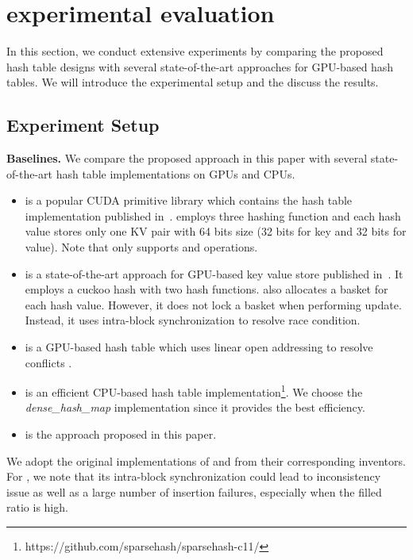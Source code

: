 \section{experimental evaluation}\label{sec:exp}
In this section, we conduct extensive experiments by comparing the proposed hash table designs with several state-of-the-art approaches for GPU-based hash tables. 
We will introduce the experimental setup and the discuss the results. 

\subsection{Experiment Setup}

\vspace{1mm}\noindent\textbf{Baselines.} We compare the proposed approach in this paper with several state-of-the-art hash table implementations on GPUs and CPUs. 
\begin{itemize}
	\item \cudpp is a popular CUDA primitive library which contains the hash table implementation published in~\cite{alcantara2009real}. 
	\cudpp employs three hashing function and each hash value stores only one KV pair with 64 bits size (32 bits for key and 32 bits for value). 
	Note that \cudpp only supports  and  operations. 
	\item \megakv is a state-of-the-art approach for GPU-based key value store published in~\cite{zhang2015mega}. It employs a cuckoo hash with two hash functions.
	\megakv also allocates a basket for each hash value. However, it does not lock a basket when performing update. Instead, it uses intra-block synchronization to resolve race condition. 
	\item \linear is a GPU-based hash table which uses linear open addressing to resolve conflicts \cite{hong2010mapcg}. 
	\item \google is an efficient CPU-based hash table implementation\footnote{https://github.com/sparsehash/sparsehash-c11/}. We choose the \emph{dense\_hash\_map} implementation since it provides the best efficiency.
	\item \voter is the approach proposed in this paper.
\end{itemize}
We adopt the original implementations of \cudpp and \google from their corresponding inventors. 
For \megakv, we note that its intra-block synchronization could lead to inconsistency issue as well as a large number of insertion failures, especially when the filled ratio is high.  
